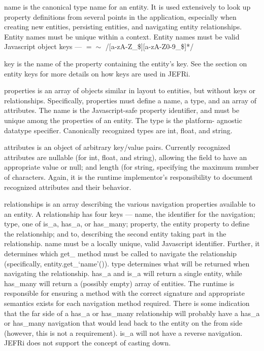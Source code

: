\documentclass{article}
\begin{document}
{\ilcode name} is the canonical type name for an entity. It is used extensively
to look up property definitions from several points in the application,
especially when creating new entities, persisting entities, and navigating
entity relationships. Entity names must be unique within a context. Entity names
must be valid Javascript object keys --- {\ilcode $=\sim$
/[a-zA-Z\_\$][a-zA-Z0-9\_\$]*/}

{\ilcode key} is the name of the property containing the entity's key. See the
section on entity keys for more details on how keys are used in JEFRi.

{\ilcode properties} is an array of objects similar in layout to entities, but
without keys or relationships. Specifically, properties must define a name, a
type, and an array of attributes. The name is the Javascript-safe property
identifier, and must be unique among the properties of an entity. The type is
the platform- agnostic datatype specifier. Canonically recognized types are
{\ilcode int}, {\ilcode float}, and {\ilcode string}.

{\ilcode attributes} is an object of arbitrary key/value pairs. Currently
recognized attributes are {\ilcode nullable} (for {\ilcode int}, {\ilcode
float}, and {\ilcode string}), allowing the field to have an appropriate value
or {\ilcode null}; and {\ilcode length} (for {\ilcode string}, specifying the
maximum number of characters. Again, it is the runtime implementor's
responsibility to document recognized attributes and their behavior.

{\ilcode relationships} is an array describing the various navigation properties
available to an entity. A relationship has four keys --- {\ilcode name}, the
identifier for the navigation; {\ilcode type}, one of {\ilcode is\_a}, {\ilcode
has\_a}, or {\ilcode has\_many}; {\ilcode property}, the entity property to
define the relationship; and {\ilcode to}, describing the second entity taking
part in the relationship. {\ilcode name} must be a locally unique, valid
Javascript identifier. Further, it determines which {\ilcode get\_} method must
be called to navigate the relationship (specifically, {\ilcode
entity.get\_`name'()}). {\ilcode type} determines what will be returned when
navigating the relationship. {\ilcode has\_a} and {\ilcode is\_a} will return a
single entity, while {\ilcode has\_many} will return a (possibly empty) array of
entities. The runtime is responsible for ensuring a method with the correct
signature and appropriate semantics exists for each navigation method required.
There is some indication that the far side of a {\ilcode has\_a} or {\ilcode
has\_many} relationship will probably have a {\ilcode has\_a} or {\ilcode
has\_many} navigation that would lead back to the entity on the from side
(however, this is not a requirement). {\ilcode is\_a} will not have a reverse
navigation. JEFRi does not support the concept of casting down.
\end{document}
